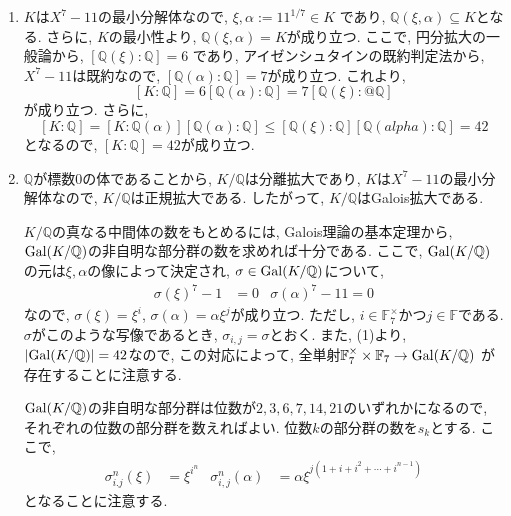 \documentclass[dvipdfmx]{jsarticle}
\begin{document}
    \begin{enumerate}
        \item $K$は$X^7-11$の最小分解体なので, $\xi, \alpha:=11^{1/7} \in K$
        であり, $\mathbb{Q}(\xi, \alpha) \subseteq K$となる.
        さらに, $K$の最小性より, $\mathbb{Q}(\xi, \alpha) = K$が成り立つ.
        ここで, 円分拡大の一般論から, $[\mathbb{Q}(\xi): \mathbb{Q}] = 6$
        であり, アイゼンシュタインの既約判定法から, $X^7-11$は既約なので,
        $[\mathbb{Q}(\alpha): \mathbb{Q}] = 7$が成り立つ.
        これより,
        \[
            [K:\mathbb{Q}] = 6[\mathbb{Q}(\alpha): \mathbb{Q}] = 7[\mathbb{Q}(\xi):@ \mathbb{Q}]
        \]
        が成り立つ.
        さらに,
        \[
            [K:\mathbb{Q}] = [K:\mathbb{Q}(\alpha)][\mathbb{Q}(\alpha):\mathbb{Q}]
            \leq [\mathbb{Q}(\xi): \mathbb{Q}][\mathbb{Q}(alpha):\mathbb{Q}] = 42
        \]
        となるので, $[K:\mathbb{Q}] = 42$が成り立つ.
        \item $\mathbb{Q}$が標数$0$の体であることから, $K/\mathbb{Q}$は分離拡大であり,
        $K$は$X^7-11$の最小分解体なので, $K/\mathbb{Q}$は正規拡大である.
        したがって, $K/\mathbb{Q}$はGalois拡大である.

        $K/\mathbb{Q}$の真なる中間体の数をもとめるには, Galois理論の基本定理から,
        $\operatorname{Gal}(K/\mathbb{Q})$の非自明な部分群の数を求めれば十分である.
        ここで, $\operatorname{Gal}(K/\mathbb{Q})$の元は$\xi, \alpha$の像によって決定され,
        $\sigma \in \operatorname{Gal}(K/\mathbb{Q})$について,
        \begin{align*}
            \sigma(\xi)^7-1 &= 0 & \sigma(\alpha)^7-11 = 0
        \end{align*}
        なので, $\sigma(\xi) = \xi^i$, $\sigma(\alpha) = \alpha\xi^j$が成り立つ.
        ただし, $i \in \mathbb{F}_7^\times$かつ$j \in \mathbb{F}$である.
        $\sigma$がこのような写像であるとき, $\sigma_{i,j} = \sigma$とおく.
        また, (1)より, $\abs{\operatorname{Gal}(K/\mathbb{Q})} = 42$なので,
        この対応によって, 全単射$\mathbb{F}_7^\times \times \mathbb{F}_7 \to \operatorname{Gal}(K/\mathbb{Q})$
        が存在することに注意する.

        $\operatorname{Gal}(K/\mathbb{Q})$の非自明な部分群は位数が$2,3,6,7,14,21$のいずれかになるので,
        それぞれの位数の部分群を数えればよい.
        位数$k$の部分群の数を$s_k$とする.
        ここで,
        \begin{align*}
            \sigma_{i.j}^n(\xi) &= \xi^{i^n} & \sigma_{i,j}^n(\alpha)  &= \alpha \xi^{j(1+i+i^2+\cdots + i^{n-1})}
        \end{align*}
        となることに注意する.


\end{enumerate}
\end{document}
